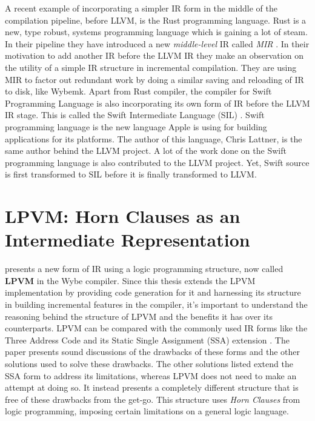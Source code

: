 A recent example of incorporating a simpler IR form in the middle of the
compilation pipeline, before LLVM, is the Rust programming language. Rust is a
new, type robust, systems programming language which is gaining a lot of
steam. In their pipeline they have introduced a new \textit{middle-level} IR
called \textit{MIR} \citep{mir}. In their motivation to add another IR before
the LLVM IR they make an observation on the utility of a simple IR structure in
incremental compilation. They are using MIR to factor out redundant work by
doing a similar saving and reloading of IR to disk, like Wybemk. Apart from Rust compiler,
the compiler for Swift Programming Language is also incorporating its own form
of IR before the LLVM IR stage. This is called the Swift Intermediate Language
(SIL) \citep{sil}. Swift programming language is the new language Apple is
using for building applications for its platforms. The author of this language,
Chris Lattner, is the same author behind the LLVM project. A lot of the work
done on the Swift programming language is also contributed to the LLVM
project. Yet, Swift source is first transformed to SIL before it is finally
transformed to LLVM.


\section{LPVM: Horn Clauses as an Intermediate Representation}
\label{sec:horn_clauses}


\cite{lpvm2015} presents a new form of IR using a logic programming structure,
now called \textbf{LPVM} in the Wybe compiler. Since this thesis extends the
LPVM implementation by providing code generation for it and harnessing its
structure in building incremental features in the compiler, it's important to
understand the reasoning behind the structure of LPVM and the benefits it has
over its counterparts. LPVM can be compared with the commonly used IR forms
like the Three Address Code and its Static Single Assignment (SSA) extension
\citep{alpernSSA}. The paper presents sound discussions of the drawbacks of
these forms and the other solutions used to solve these drawbacks. The other
solutions listed extend the SSA form to address its limitations, whereas LPVM
does not need to make an attempt at doing so. It instead presents a completely
different structure that is free of these drawbacks from the get-go. This
structure uses \textit{Horn Clauses} from logic programming, imposing certain
limitations on a general logic language.

